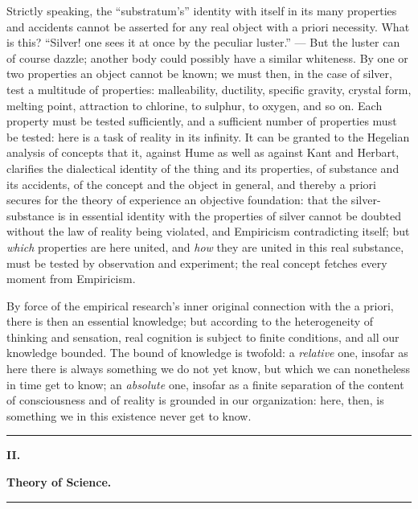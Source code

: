 \documentclass[12pt]{book}
\begin{document}
Strictly speaking, the ``substratum's'' identity with itself in its many properties
and accidents cannot be asserted for any real object with a priori necessity. What
is this? ``Silver! one sees it at once by the peculiar luster.'' — But the luster can
of course dazzle; another body could possibly have a similar whiteness. By one or two
properties an object cannot be known; we must then, in the case of silver, test a
multitude of properties: malleability, ductility, specific gravity, crystal form,
melting point, attraction to chlorine, to sulphur, to oxygen, and so on. Each property
must be tested sufficiently, and a sufficient number of properties must be tested:
here is a task of reality in its infinity.
It can be granted to the Hegelian analysis of concepts that it, against Hume as well
as against Kant and Herbart, clarifies the dialectical identity of the thing and its
properties, of substance and its accidents, of the concept and the object in general,
and thereby a priori secures for the theory of experience an objective foundation:
that the silver-substance is in essential identity with the properties of silver
cannot be doubted without the law of reality being violated, and Empiricism
contradicting itself; but \emph{which} properties are here united, and \emph{how}
they are united in this real substance, must be tested by observation and experiment;
the real concept fetches every moment from Empiricism.

By force of the empirical research's inner original connection with the a priori,
there is then an essential knowledge; but according to the heterogeneity of thinking
and sensation, real cognition is subject to finite conditions, and all our knowledge
bounded. The bound of knowledge is twofold: a \emph{relative} one, insofar as here
there is always something we do not yet know, but which we can nonetheless in time get
to know; an \emph{absolute} one, insofar as a finite separation of the content of
consciousness and of reality is grounded in our organization: here, then, is something
we in this existence never get to know.

\begin{center}\rule{0.35\linewidth}{0.4pt}\end{center}

\begin{center}
  {\large\bfseries II.}\par\vspace{4pt}
  {\Large\bfseries Theory of Science.}\par\vspace{4pt}
  \rule{2.5cm}{0.4pt}
\end{center}
{}
\end{document}
